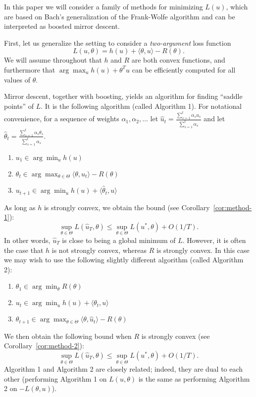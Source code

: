 \documentclass{article}
\begin{document}
In this paper we will consider a family of methods for minimizing $L(u)$, 
which are based on Bach's generalization of the Frank-Wolfe algorithm and can 
be interpreted as boosted mirror descent.

First, let us generalize the setting 
to consider a \emph{two-argument} loss function
\begin{equation}
L(u,\theta) = h(u) + \langle \theta, u \rangle - R(\theta).
\end{equation}
We will assume throughout that $h$ and $R$ are both convex functions, 
and furthermore that $\arg\max_{u} h(u) + \theta^Tu$ can be efficiently 
computed for all values of $\theta$.

Mirror descent, together with boosting, yields an algorithm for finding 
``saddle points'' of $L$. It is the following algorithm (called Algorithm 1).
For notational convenience, for a sequence of weights $\alpha_1,\alpha_2,\ldots$ 
let $\hat{u}_t = \frac{\sum_{s=1}^t \alpha_su_s}{\sum_{s=1}^t \alpha_s}$ and let 
$\hat{\theta}_t = \frac{\sum_{s=1}^t \alpha_s\theta_s}{\sum_{s=1}^t \alpha_s}$.
\begin{enumerate}
\item $u_1 \in \arg\min_u h(u)$
\item $\theta_{t} \in \arg\max_{\theta \in \Theta} \langle \theta, u_t \rangle - R(\theta)$
\item $u_{t+1} \in \arg\min_{u} h(u) + \langle \hat{\theta}_t, u \rangle$
\end{enumerate}
As long as $h$ is strongly convex, we obtain the 
bound (see Corollary~\ref{cor:method-1}):
\begin{equation}
\sup_{\theta \in \Theta} L(\hat{u}_T, \theta) \leq \sup_{\theta \in \Theta} L(u^*, \theta) + O(1/T).
\end{equation}
In other words, $\hat{u}_T$ is close to being a global minimum of $L$.
However, it is often the case that $h$ is not strongly convex, whereas $R$ is strongly convex. In this case 
we may wish to use the following slightly different algorithm (called Algorithm 2):
\begin{enumerate}
\item $\theta_1 \in \arg\min_{\theta} R(\theta)$
\item $u_t \in \arg\min_{u} h(u) + \langle \theta_t, u \rangle$
\item $\theta_{t+1} \in \arg\max_{\theta \in \Theta} \langle \theta, \hat{u}_t \rangle - R(\theta)$
\end{enumerate}
We then obtain the following bound 
when $R$ is strongly convex (see Corollary~\ref{cor:method-2}):
\[ \sup_{\theta \in \Theta} L(\hat{u}_T, \theta) \leq \sup_{\theta \in \Theta} L(u^*, \theta) + O(1/T). \]
Algorithm 1 and Algorithm 2 are closely related; indeed, they are dual to each other 
(performing Algorithm 1 on $L(u,\theta)$ is the same as performing Algorithm 2 on 
$-L(\theta,u)$).
\end{document}
